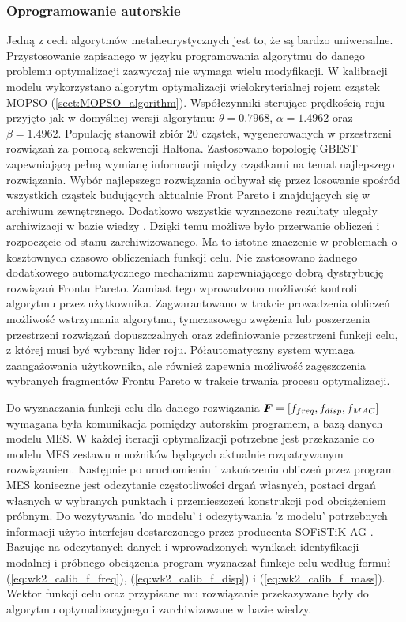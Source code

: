\subsubsection{Oprogramowanie autorskie}
Jedną z cech algorytmów metaheurystycznych jest to, że są bardzo uniwersalne. Przystosowanie zapisanego w języku programowania algorytmu do danego problemu optymalizacji zazwyczaj nie wymaga wielu modyfikacji. W kalibracji modelu wykorzystano algorytm optymalizacji wielokryterialnej rojem cząstek MOPSO (\ref{sect:MOPSO_algorithm}). Współczynniki sterujące prędkością roju przyjęto jak w domyślnej wersji algorytmu: $\theta=0.7968$, $\alpha=1.4962$ oraz $\beta=1.4962$. Populację stanowił zbiór 20 cząstek, wygenerowanych w przestrzeni rozwiązań za pomocą sekwencji Haltona. Zastosowano topologię GBEST zapewniającą pełną wymianę informacji między cząstkami na temat najlepszego rozwiązania. Wybór najlepszego rozwiązania odbywał się przez losowanie spośród wszystkich cząstek budujących aktualnie Front Pareto i znajdujących się w archiwum zewnętrznego. Dodatkowo wszystkie wyznaczone rezultaty ulegały archiwizacji w bazie wiedzy . Dzięki temu możliwe było przerwanie obliczeń i rozpoczęcie od stanu zarchiwizowanego. Ma to istotne znaczenie w problemach o kosztownych czasowo obliczeniach funkcji celu. Nie zastosowano żadnego dodatkowego automatycznego mechanizmu zapewniającego dobrą dystrybucję rozwiązań Frontu Pareto. Zamiast tego wprowadzono możliwość kontroli algorytmu przez użytkownika. Zagwarantowano w trakcie prowadzenia obliczeń możliwość wstrzymania algorytmu, tymczasowego zwężenia lub poszerzenia przestrzeni rozwiązań dopuszczalnych oraz zdefiniowanie przestrzeni funkcji celu, z której musi być wybrany lider roju. Półautomatyczny system wymaga zaangażowania użytkownika, ale również zapewnia możliwość zagęszczenia wybranych fragmentów Frontu Pareto w trakcie trwania procesu optymalizacji.

Do wyznaczania funkcji celu dla danego rozwiązania $\bm{F}=[f_{freq},f_{disp},f_{MAC}]$ wymagana była komunikacja pomiędzy autorskim programem, a bazą danych modelu MES. W każdej iteracji optymalizacji potrzebne jest przekazanie do modelu MES zestawu mnożników będących aktualnie rozpatrywanym rozwiązaniem. Następnie po uruchomieniu i zakończeniu obliczeń przez program MES konieczne jest odczytanie częstotliwości drgań własnych, postaci drgań własnych w wybranych punktach i przemieszczeń konstrukcji pod obciążeniem próbnym. Do wczytywania 'do modelu' i odczytywania 'z modelu' potrzebnych informacji użyto interfejsu dostarczonego przez producenta SOFiSTiK AG \parencite{SOFISTIK2018}. Bazując na odczytanych danych i wprowadzonych wynikach identyfikacji modalnej i próbnego obciążenia program wyznaczał funkcje celu według formuł (\ref{eq:wk2_calib_f_freq}), (\ref{eq:wk2_calib_f_disp}) i (\ref{eq:wk2_calib_f_mass}). Wektor funkcji celu oraz przypisane mu rozwiązanie przekazywane były do algorytmu optymalizacyjnego i zarchiwizowane w bazie wiedzy.

